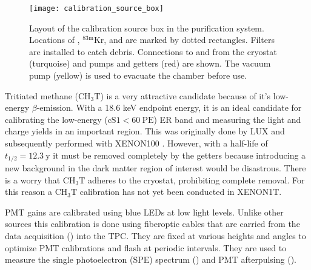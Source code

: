 \begin{figure}
\centering
\texttt{[image: calibration\_source\_box]}
\caption[Layout of the calibration source box in the purification system.]{Layout of the calibration source box in the purification
system.  Locations of , $^{83\mathrm{m}}\mathrm{Kr}$, and
 are marked by dotted rectangles.  Filters are installed to catch debris.  Connections to and from the cryostat (turquoise)
and pumps and getters (red) are shown.  The vacuum pump (yellow) is used to evacuate the chamber before use.}
\label{fig:xenon1t_pur_cal_box_schematic}
\end{figure}

Tritiated methane ($\mathrm{C H_3 T}$) is a very attractive candidate because of it's low-energy $\beta$-emission.  With a 18.6 keV
endpoint energy, it is an ideal candidate for calibrating the low-energy ($\mathrm{cS1} < 60\ \mathrm{PE}$) ER band
and measuring
the light and charge yields in an important region.  This was originally done by LUX  and
subsequently performed with XENON100 .  However, with a half-life of $t_{1/2} = 12.3\ \mathrm{y}$ it must be
removed completely by the getters because introducing a new background in the dark matter region of interest would be disastrous.  There
is a worry that
$\mathrm{C H_3 T}$ adheres to the cryostat, prohibiting complete removal.  For this reason a $\mathrm{C H_3 T}$ calibration has not
yet been conducted in XENON1T.

PMT gains are calibrated using blue LEDs at low light levels.  Unlike other sources this calibration is done using fiberoptic cables that
are
carried from the data acquisition () into the TPC.  They are fixed at various heights and angles to optimize
PMT calibrations and flash at periodic intervals.  They are used to measure the single photoelectron (SPE) spectrum
() and PMT afterpulsing ().


